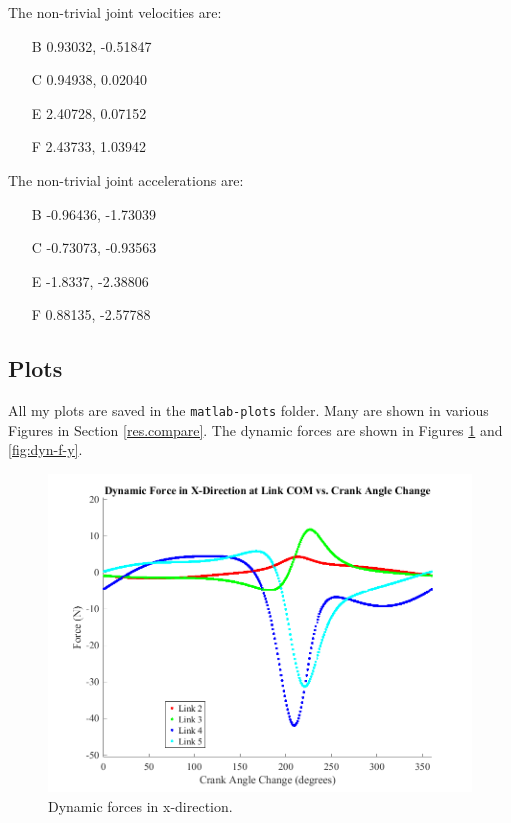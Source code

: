 \documentclass[12pt]{article}
\begin{document}
\noindent The non-trivial joint velocities are:
\begin{enumerate}
        \item[B] 0.93032, -0.51847
        \item[C] 0.94938,  0.02040
        \item[E] 2.40728,  0.07152
        \item[F] 2.43733,  1.03942
\end{enumerate}
\bigskip

\noindent The non-trivial joint accelerations are:
\begin{enumerate}
        \item[B] -0.96436, -1.73039
        \item[C] -0.73073, -0.93563
        \item[E] -1.8337, -2.38806
        \item[F] 0.88135, -2.57788
\end{enumerate}

\subsection{Plots}%
\label{res.plots}

All my plots are saved in the \texttt{matlab-plots} folder. Many are shown in various Figures in Section \ref{res.compare}. The dynamic forces are shown in Figures \ref{fig:dyn-f-x} and \ref{fig:dyn-f-y}.

\begin{figure}[H]
  \centering
  \includegraphics[scale=0.7]{../matlab-plots/dynamicForcesX.png}
  \caption{\label{fig:dyn-f-x}Dynamic forces in x-direction.}
\end{figure}
\end{document}
